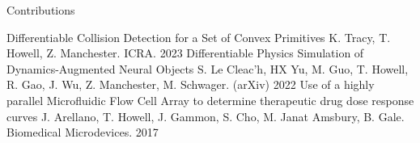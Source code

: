 \begin{center} \small{Contributions} \end{center}
\begin{cvhonors}

\cvhonor 
    {Differentiable Collision Detection for a Set of Convex Primitives}
    {K. Tracy, T. Howell, Z. Manchester. ICRA.}
    {}
    {2023}
\cvhonor
    {Differentiable Physics Simulation of Dynamics-Augmented Neural Objects}
    {S. Le Cleac'h, HX Yu, M. Guo, T. Howell, R. Gao, J. Wu, Z. Manchester, M. Schwager. (arXiv)}
    {}
    {2022}
\cvhonor
    {Use of a highly parallel Microfluidic Flow Cell Array to determine therapeutic drug dose response curves}
    {J. Arellano, T. Howell, J. Gammon, S. Cho, M. Janat Amsbury, B. Gale. Biomedical Microdevices.}
    {}
    {2017}
    
\end{cvhonors}
